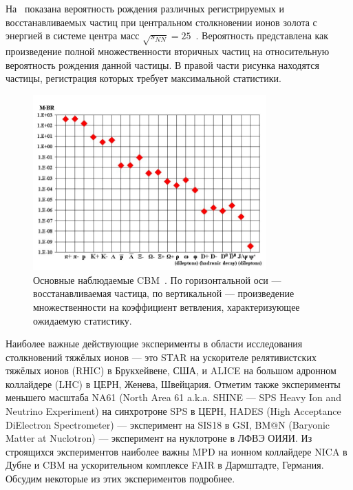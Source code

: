 На~ показана вероятность рождения различных регистрируемых и восстанавливаемых частиц при центральном столкновении ионов золота с энергией в системе центра масс $\sqrt{s_{NN}}=25$~\GeVperNucl{}. Вероятность представлена как произведение полной множественности вторичных частиц на относительную вероятность рождения данной частицы. В правой части рисунка находятся частицы, регистрация которых требует максимальной статистики.

\begin{figure}[H]
\centering
\includegraphics[width=0.8\textwidth]{pictures/CBM_observables.png}
\caption{Основные наблюдаемые CBM~\cite{CBMBook}. По горизонтальной оси --- восстанавливаемая частица, по вертикальной --- произведение множественности на коэффициент ветвления, характеризующее ожидаемую статистику.}
\label{fig:CBMParticlesYields}
\end{figure}



Наиболее важные действующие эксперименты в области исследования столкновений тяжёлых ионов --- это STAR на ускорителе релятивистских тяжёлых ионов (RHIC) в Брукхейвене, США, и ALICE на большом адронном коллайдере (LHC) в ЦЕРН, Женева, Швейцария. Отметим также эксперименты меньшего масштаба NA61 (North Area 61 a.k.a. SHINE --- SPS Heavy Ion and Neutrino Experiment) на синхротроне SPS в ЦЕРН, HADES (High Acceptance DiElectron Spectrometer) --- эксперимент на SIS18 в GSI, BM$@$N (Baryonic Matter at Nuclotron) --- эксперимент на нуклотроне в ЛФВЭ ОИЯИ. Из строящихся экспериментов наиболее важны MPD на ионном коллайдере NICA в Дубне и CBM на ускорительном комплексе FAIR в Дармштадте, Германия. Обсудим некоторые из этих экспериментов подробнее.


